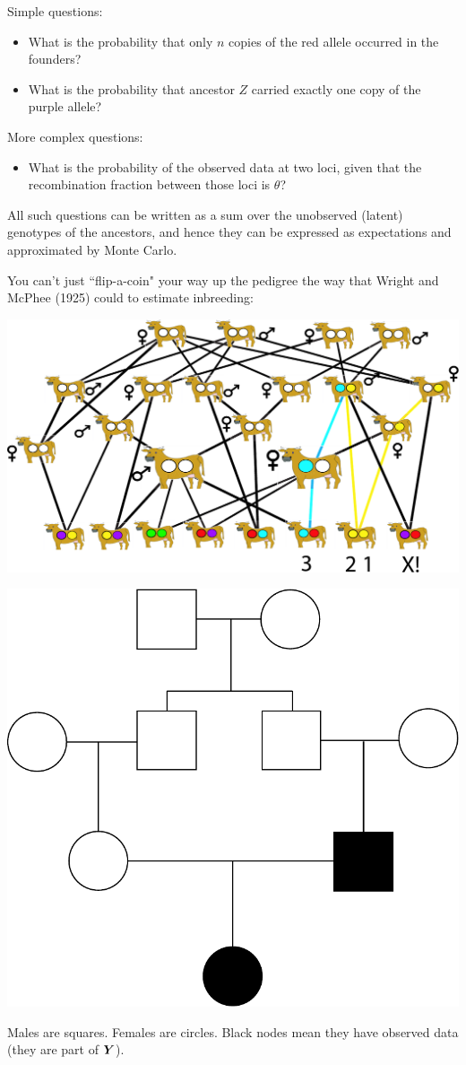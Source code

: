 Simple questions:
\begin{itemize}
\item What is the probability that only $n$ copies of the red allele occurred in the founders?
\item What is the probability that ancestor $Z$ carried exactly one copy of the purple allele?
\end{itemize}
More complex questions:
\begin{itemize}
\item What is the probability of the observed data at two loci, given that the recombination fraction between those loci is $\theta$?
\end{itemize}
All such questions can be written as a sum over the unobserved (latent) genotypes of the ancestors, and hence they can be expressed as expectations and approximated by Monte Carlo.  

You can't just ``flip-a-coin" your way up the pedigree the way that Wright and McPhee (1925) could to estimate inbreeding:
\begin{center}
\includegraphics[width=.90\textwidth]{illus/cows_naive.pdf}
\end{center}

\begin{center}
\includegraphics[width=.35\textwidth]{illus/ped1.pdf}
\end{center}
Males are squares.  Females are circles.  Black nodes mean they have observed data (\ie they are part of $\bY$).

